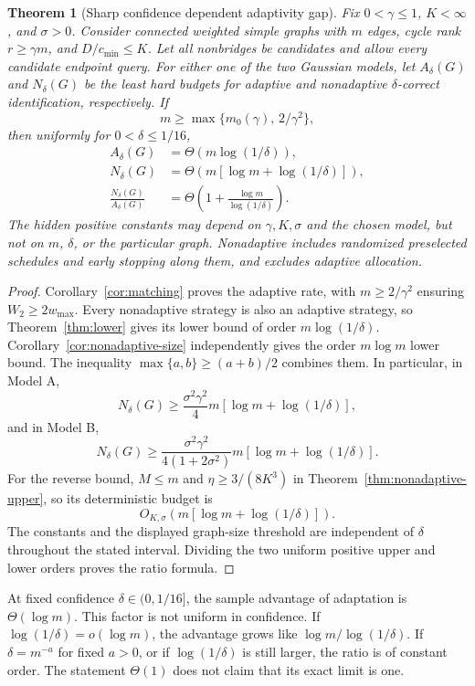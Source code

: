 \documentclass[11pt,letterpaper]{article}
\newtheorem{theorem}{Theorem}
\begin{document}
\begin{theorem}[Sharp confidence dependent adaptivity gap]\label{thm:gap}
Fix $0<\gamma\le1$, $K<\infty$, and $\sigma>0$. Consider connected weighted simple graphs with $m$ edges, cycle rank $r\ge\gamma m$, and $D/c_{\min}\le K$. Let all nonbridges be candidates and allow every candidate endpoint query. For either one of the two Gaussian models, let $A_\delta(G)$ and $N_\delta(G)$ be the least hard budgets for adaptive and nonadaptive $\delta$-correct identification, respectively. If
\[
 m\ge\max\{m_0(\gamma),\,2/\gamma^2\},
\]
then uniformly for $0<\delta\le1/16$,
\[
 \begin{aligned}
 A_\delta(G)&=\Theta\left(m\log(1/\delta)\right),\\
 N_\delta(G)&=\Theta\left(m[\log m+\log(1/\delta)]\right),\\
 \frac{N_\delta(G)}{A_\delta(G)}
 &=\Theta\left(1+\frac{\log m}{\log(1/\delta)}\right).
 \end{aligned}
\]
The hidden positive constants may depend on $\gamma,K,\sigma$ and the chosen model, but not on $m$, $\delta$, or the particular graph. Nonadaptive includes randomized preselected schedules and early stopping along them, and excludes adaptive allocation.
\end{theorem}
\begin{proof}
Corollary~\ref{cor:matching} proves the adaptive rate, with $m\ge2/\gamma^2$ ensuring $W_2\ge2w_{\max}$. Every nonadaptive strategy is also an adaptive strategy, so Theorem~\ref{thm:lower} gives its lower bound of order $m\log(1/\delta)$. Corollary~\ref{cor:nonadaptive-size} independently gives the order $m\log m$ lower bound. The inequality $\max\{a,b\}\ge(a+b)/2$ combines them. In particular, in Model A,
\[
 N_\delta(G)\ge\frac{\sigma^2\gamma^2}{4}
 m[\log m+\log(1/\delta)],
\]
and in Model B,
\[
 N_\delta(G)\ge\frac{\sigma^2\gamma^2}{4(1+2\sigma^2)}
 m[\log m+\log(1/\delta)].
\]
For the reverse bound, $M\le m$ and $\eta\ge3/(8K^3)$ in Theorem~\ref{thm:nonadaptive-upper}, so its deterministic budget is
\[
 O_{K,\sigma}\left(m[\log m+\log(1/\delta)]\right).
\]
The constants and the displayed graph-size threshold are independent of $\delta$ throughout the stated interval. Dividing the two uniform positive upper and lower orders proves the ratio formula.
\end{proof}

At fixed confidence $\delta\in(0,1/16]$, the sample advantage of adaptation is $\Theta(\log m)$. This factor is not uniform in confidence. If $\log(1/\delta)=o(\log m)$, the advantage grows like $\log m/\log(1/\delta)$. If $\delta=m^{-a}$ for fixed $a>0$, or if $\log(1/\delta)$ is still larger, the ratio is of constant order. The statement $\Theta(1)$ does not claim that its exact limit is one.
\end{document}
